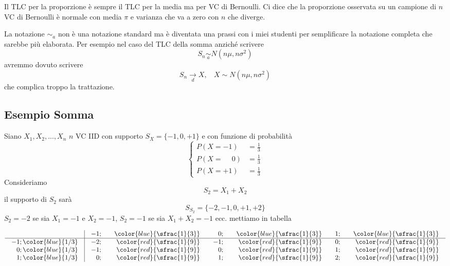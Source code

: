 \documentclass[
  11pt,
]{book}
\theoremstyle{mytheoremstyle}
\theoremstyle{mydefstyle}
\newenvironment{nota}
  {
\begin{tcolorbox}[enhanced,breakable,arc=0.1mm,boxrule=1pt,colback=white,colframe=iblue,title=\bf \fontfamily{lmss}\selectfont \faInfoCircle \hspace{.5 cm} Nota,drop fuzzy shadow]
}{
\end{tcolorbox}
  }
\begin{document}
Il TLC per la proporzione è sempre il TLC per la media ma per VC di
Bernoulli. Ci dice che la proporzione osservata su un campione di \(n\) VC
di Bernoulli è normale con media \(\pi\) e varianza che va a zero con \(n\)
che diverge.

\begin{nota}
La notazione \(\operatorname*{\sim}_{a}\) non è una notazione standard ma
è diventata una prassi con i miei studenti per semplificare la notazione
completa che sarebbe più elaborata. Per esempio nel caso del TLC della
somma anziché scrivere \[
S_n\operatorname*{\sim}_{a} N(n\mu,n\sigma^2)
\] avremmo dovuto scrivere \[
S_n\operatorname*{\rightarrow}_{d} X,~~~~ X\sim N(n\mu,n\sigma^2)
\] che complica troppo la trattazione.

\end{nota}

\subsection{Esempio Somma}\label{esempio-somma}

Siano \(X_1, X_2,...,X_n\) \(n\) VC IID con supporto \(S_X=\{-1,0,+1\}\) e con
funzione di probabilità \[
\begin{cases}
P(X=-1)&=\frac 13\\
P(X=\phantom{-}0)&=\frac 13\\
P(X=+1)&=\frac 13
\end{cases}
\] Consideriamo \[
S_2=X_1+X_2
\] il supporto di \(S_2\) sarà \[S_{S_2}=\{-2,-1,0,+1,+2 \} \] \(S_2=-2\) se
sia \(X_1=-1\) e \(X_2=-1\), \(S_2=-1\) se sia \(X_1+X_2=-1\) ecc. mettiamo in
tabella

\normalsize

\[\arraycolsep=10pt\def\arraystretch{1}\begin{array}{ r|rrrrrr }
& -1 ;&\color{blue}{ \sfrac{ 1 } { 3 }} & 0 ;&\color{blue}{ \sfrac{ 1 } { 3 }} & 1 ;&\color{blue}{ \sfrac{ 1 } { 3 }} \\ 
\hline 
-1 ;\color{blue}{ 1 / 3 }& -2;&\color{red}{\sfrac{1}{9}}& -1;&\color{red}{\sfrac{1}{9}}& 0;&\color{red}{\sfrac{1}{9}}\\ 
0 ;\color{blue}{ 1 / 3 }& -1;&\color{red}{\sfrac{1}{9}}& 0;&\color{red}{\sfrac{1}{9}}& 1;&\color{red}{\sfrac{1}{9}}\\ 
1 ;\color{blue}{ 1 / 3 }& 0;&\color{red}{\sfrac{1}{9}}& 1;&\color{red}{\sfrac{1}{9}}& 2;&\color{red}{\sfrac{1}{9}}\\ 
\end{array}
 \]
\end{document}
